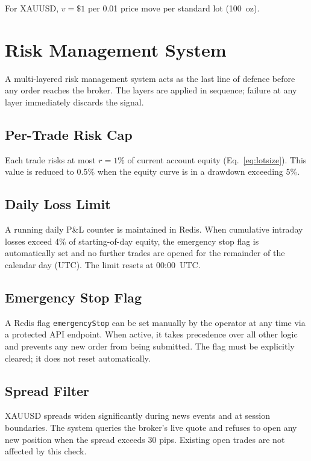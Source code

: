 \documentclass[conference]{IEEEtran}
\begin{document}
For XAUUSD, $v = \$1$ per 0.01 price move per standard lot
(100~oz).

\section{Risk Management System}

A multi-layered risk management system acts as the last line of
defence before any order reaches the broker.  The layers are applied
in sequence; failure at any layer immediately discards the signal.

\subsection{Per-Trade Risk Cap}

Each trade risks at most $r = 1\%$ of current account equity
(Eq.~\ref{eq:lotsize}).  This value is reduced to 0.5\% when the
equity curve is in a drawdown exceeding 5\%.

\subsection{Daily Loss Limit}

A running daily P\&L counter is maintained in Redis.  When
cumulative intraday losses exceed 4\% of starting-of-day equity,
the emergency stop flag is automatically set and no further trades
are opened for the remainder of the calendar day (UTC).  The limit
resets at 00:00~UTC.

\subsection{Emergency Stop Flag}

A Redis flag \texttt{emergencyStop} can be set manually by the
operator at any time via a protected API endpoint.  When active, it
takes precedence over all other logic and prevents any new order
from being submitted.  The flag must be explicitly cleared; it does
not reset automatically.

\subsection{Spread Filter}

XAUUSD spreads widen significantly during news events and at session
boundaries.  The system queries the broker's live quote and refuses
to open any new position when the spread exceeds 30 pips.  Existing
open trades are not affected by this check.
\end{document}
